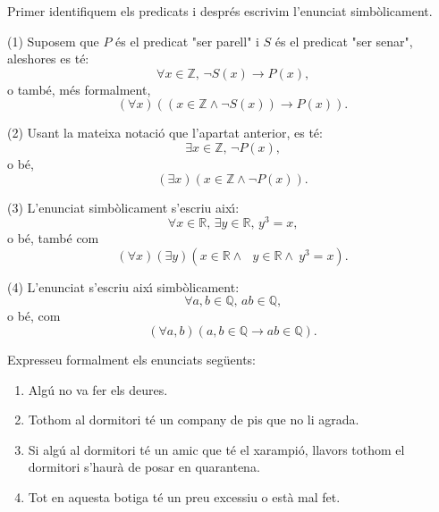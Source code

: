 \begin{solucio}
Primer identifiquem els predicats i despr\'{e}s escrivim l'enunciat simb\`{o}licament.

(1) Suposem que $P$ \'{e}s el predicat "ser parell" i $S$ \'{e}s el predicat
"ser senar", aleshores es t\'{e}:%
\[
\forall x\in\mathbb{Z}\text{, }\lnot S(x)\longrightarrow P(x)\text{,}%
\]
o tamb\'{e}, m\'{e}s formalment,
\[
\left(  \forall x\right)  \left(  \left(  x\in\mathbb{Z}\wedge\lnot
S(x)\right)  \longrightarrow P\left(  x\right)  \right)  \text{.}%
\]


(2) Usant la mateixa notaci\'{o} que l'apartat anterior, es t\'{e}:%
\[
\exists x\in\mathbb{Z}\text{, }\lnot P\left(  x\right)  \text{,}%
\]
o b\'{e},%
\[
\left(  \exists x\right)  \left(  x\in\mathbb{Z\wedge}\lnot P\left(  x\right)
\right)  \text{.}%
\]


(3) L'enunciat simb\`{o}licament s'escriu aix\'{\i}:%
\[
\forall x\in\mathbb{R}\text{, }\exists y\in\mathbb{R}\text{, }y^{3}=x\text{,}%
\]
o b\'{e}, tamb\'{e} com%
\[
\left(  \forall x\right)  \left(  \exists y\right)  \left(  x\in
\mathbb{R\wedge}\text{ }y\in\mathbb{R\wedge~}y^{3}=x\right)  \text{.}%
\]


(4) L'enunciat s'escriu aix\'{\i} simb\`{o}licament:%
\[
\forall a,b\in\mathbb{Q}\text{, }ab\in\mathbb{Q}\text{,}%
\]
o b\'{e}, com%
\[
\left(  \forall a,b\right)  \left(  a,b\in\mathbb{Q}\longrightarrow
ab\in\mathbb{Q}\right)  \text{.}%
\]

\end{solucio}

\begin{exercici}
Expresseu formalment els enunciats seg\"{u}ents:

\begin{enumerate}
\item Alg\'{u} no va fer els deures.

\item Tothom al dormitori t\'{e} un company de pis que no li agrada.

\item Si alg\'{u} al dormitori t\'{e} un amic que t\'{e} el xarampi\'{o},
llavors tothom el dormitori s'haur\`{a} de posar en quarantena.

\item Tot en aquesta botiga t\'{e} un preu excessiu o est\`{a} mal fet.
\end{enumerate}
\end{exercici}

